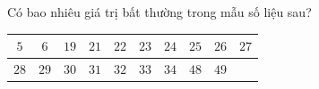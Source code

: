 \begin{ex}
Có bao nhiêu giá trị bất thường trong mẫu số liệu sau?
\begin{center}
\begin{tabular}{|c|c|c|c|c|c|c|c|c|c|}\hline
$5$ & $6$ & $19$ & $21$ & $22$ & $23$ & $24$ & $25$ & $26$ & $27$\\\hline
$28$ & $29$ & $30$ & $31$ & $32$ & $33$ & $34$ & $48$ & $49$ & \\\hline
\end{tabular}
\end{center}
\end{ex}
